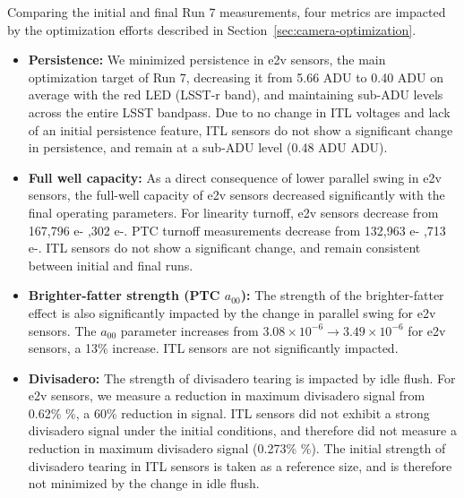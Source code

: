 Comparing the initial and final Run 7 measurements, four metrics are impacted by the optimization efforts described in Section~\ref{sec:camera-optimization}.
\begin{itemize}
  \item \textbf{Persistence:} We minimized persistence in e2v sensors, the main optimization target of Run 7, decreasing it from 5.66 ADU to 0.40 ADU on average with the red LED (LSST-r band), and maintaining sub-ADU levels across the entire LSST bandpass. Due to no change in ITL voltages and lack of an initial persistence feature, ITL sensors do not show a significant change in persistence, and remain at a sub-ADU level (0.48 ADU  ADU).
  \item \textbf{Full well capacity:} As a direct consequence of lower parallel swing in e2v sensors, the full-well capacity of e2v sensors decreased significantly with the final operating parameters. For linearity turnoff, e2v sensors decrease from 167,796 e- ,302 e-. PTC turnoff measurements decrease from 132,963 e- ,713 e-. ITL sensors do not show a significant change, and remain consistent between initial and final runs.
  \item \textbf{Brighter-fatter strength (PTC $a_{00}$):} The strength of the brighter-fatter effect is also significantly impacted by the change in parallel swing for e2v sensors. The $a_{00}$ parameter increases from $3.08\times10^{-6} \rightarrow 3.49\times10^{-6}$ for e2v sensors, a 13\% increase. ITL sensors are not significantly impacted.%
  \item \textbf{Divisadero:} The strength of divisadero tearing is impacted by idle flush. For e2v sensors, we measure a reduction in maximum divisadero signal from 0.62\% \%, a 60\% reduction in signal. ITL sensors did not exhibit a strong divisadero signal under the initial conditions, and therefore did not measure a reduction in maximum divisadero signal (0.273\% \%). The initial strength of divisadero tearing in ITL sensors is taken as a reference size, and is therefore not minimized by the change in idle flush.
\end{itemize}

